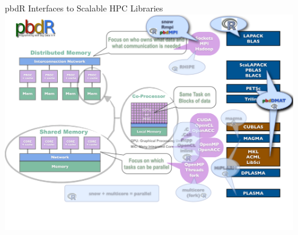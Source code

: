 \begin{frame}
  \begin{block}{pbdR Interfaces to Scalable HPC Libraries}
    \includegraphics[width=0.95\textwidth]{../common/pics/hardware/ParallelHardware13.pdf}
  \end{block}
\end{frame}


